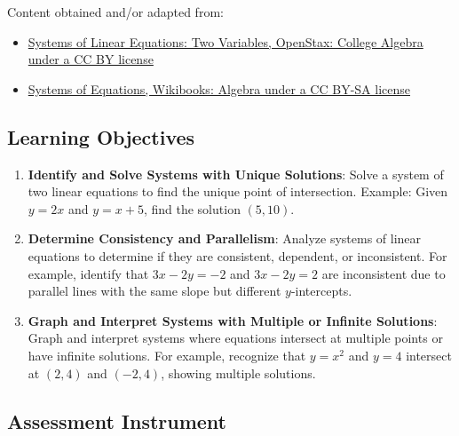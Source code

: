 Content obtained and/or adapted from:

\begin{itemize}
    \item \href{https://openstax.org/books/college-algebra/pages/7-1-systems-of-linear-equations-two-variables}{Systems of Linear Equations: Two Variables, OpenStax: College Algebra under a CC BY license}
    \item \href{https://en.wikibooks.org/wiki/Algebra/Systems_of_Equations}{Systems of Equations, Wikibooks: Algebra under a CC BY-SA license}
\end{itemize}

\subsection{Learning Objectives}

\begin{enumerate}
    \item \textbf{Identify and Solve Systems with Unique Solutions}: Solve a system of two linear equations to find the unique point of intersection. Example: Given $y = 2x$ and $y = x + 5$, find the solution $(5, 10)$.
    \item \textbf{Determine Consistency and Parallelism}: Analyze systems of linear equations to determine if they are consistent, dependent, or inconsistent. For example, identify that $3x - 2y = -2$ and $3x - 2y = 2$ are inconsistent due to parallel lines with the same slope but different $y$-intercepts.
    \item \textbf{Graph and Interpret Systems with Multiple or Infinite Solutions}: Graph and interpret systems where equations intersect at multiple points or have infinite solutions. For example, recognize that $y = x^2$ and $y = 4$ intersect at $(2, 4)$ and $(-2, 4)$, showing multiple solutions.
\end{enumerate}

\subsection{Assessment Instrument}

